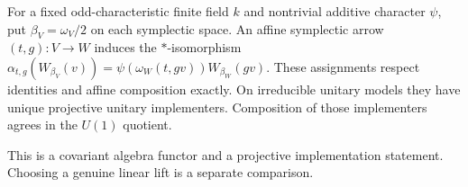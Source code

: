 \begin{proposition}
\statusProved{}
For a fixed odd-characteristic finite field $k$ and nontrivial additive character
$\psi$, put $\beta_V=\omega_V/2$ on each symplectic space. An affine symplectic arrow
$(t,g):V\to W$ induces the $*$-isomorphism
$\alpha_{t,g}(W_{\beta_V}(v))=\psi(\omega_W(t,gv))W_{\beta_W}(gv)$. These assignments
respect identities and affine composition exactly. On irreducible unitary models they
have unique projective unitary implementers. Composition of those implementers agrees
in the $U(1)$ quotient.
\end{proposition}
\begin{scope}
This is a covariant algebra functor and a projective implementation statement. Choosing a genuine linear lift is a separate comparison.
\end{scope}

